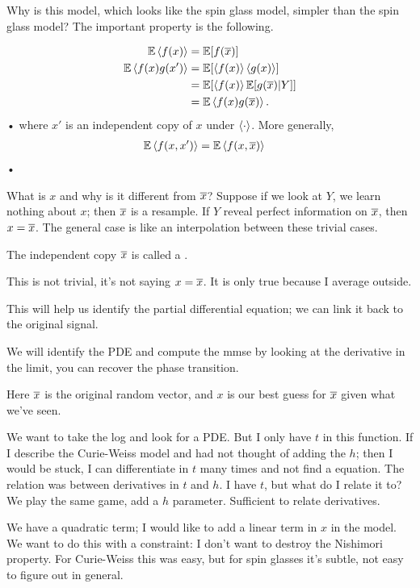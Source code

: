 Why is this model, which looks like the spin glass model, simpler than the spin glass model? The important property is the following.
\begin{pr}[Nishimori]
\begin{align*}
\mathbb{E}\left\langle {f(x)}\right\rangle &= \mathbb{E}[f(\overline{x})]\\
\mathbb{E}\left\langle {f(x)g(x')}\right\rangle &= \mathbb{E}[\left\langle {f(x)}\right\rangle\left\langle {g(x)}\right\rangle]\\
&=\mathbb{E}[\left\langle {f(x)}\right\rangle\mathbb{E}[g(\overline{x})|Y]]\\
&= \mathbb{E}\left\langle {f(x) g(\overline{x})}\right\rangle.
\end{align*}•
where $x'$ is an independent copy of $x$ under $\left\langle {\cdot}\right\rangle$.
More generally,
\begin{align*}
\mathbb{E}\left\langle {f(x,x')}\right\rangle &= \mathbb{E}\left\langle {f(x,\overline{x})}\right\rangle
\end{align*}•
\end{pr}
What is $x$ and why is it different from $\overline{x}$? Suppose if we look at $Y$, we learn nothing about $x$; then $\overline{x}$ is a resample. If $Y$ reveal perfect information on $\overline{x}$, then $x=\overline{x}$. The general case is like an interpolation between these trivial cases.

The independent copy $\overline{x}$ is called a .

This is not trivial, it's not saying $x=\overline{x}$. It is only true because I average outside. 

This will help us identify the partial differential equation; we can link it back to the original signal. 


We will identify the PDE and compute the mmse by looking at the derivative in the limit, you can recover the phase transition.

Here $\overline{x}$ is the original random vector, and $x$ is our best guess for $\overline{x}$ given what we've seen. 

We want to take the log and look for a PDE. But I only have $t$ in this function. If I describe the Curie-Weiss model and had not thought of adding the $h$; then I would be stuck, I can differentiate in $t$ many times and not find a equation. The relation was between derivatives in $t$ and $h$. I have $t$, but what do I relate it to? We play the same game, add a $h$ parameter. Sufficient to relate derivatives.

We have a quadratic term; I would like to add a linear term in $x$ in the model. We want to do this with a constraint: I don't want to destroy the Nishimori property. For Curie-Weiss this was easy, but for spin glasses it's subtle, not easy to figure out in general.

